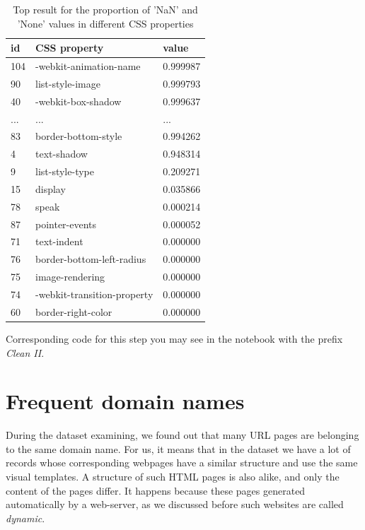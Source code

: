 \begin{table}[h]
\begin{center}
{\renewcommand{\arraystretch}{1.5}
\begin{tabular}{| p{2cm} | p{5cm}| p{3cm} |}
\hline
\textbf{id}    &    \textbf{CSS property}    &    \textbf{value} \\
\hline
104    &    -webkit-animation-name    &    0.999987 \\
\hline
90    &    list-style-image    &    0.999793 \\
\hline
40    &    -webkit-box-shadow    &    0.999637 \\
\hline
...    &    ...    &    ... \\
\hline
83    &    border-bottom-style    &    0.994262 \\
\hline
4    &    text-shadow    &    0.948314 \\
\hline
9    &    list-style-type    &    0.209271 \\
\hline
15    &    display    &    0.035866 \\
\hline
78    &    speak    &    0.000214 \\
\hline
87    &    pointer-events    &    0.000052 \\
\hline
71    &    text-indent    &    0.000000 \\
\hline
76    &    border-bottom-left-radius    &    0.000000 \\
\hline
75    &    image-rendering    &    0.000000 \\
\hline
74    &    -webkit-transition-property    &    0.000000 \\
\hline
60    &    border-right-color    &    0.000000 \\
\hline
\end{tabular}}
\caption{Top result for the proportion of 'NaN' and 'None' values in different CSS properties }
\label{table:cssnan}
\end{center}
\end{table}


Corresponding code for this step you may see in the notebook with the prefix \textit{Clean II}.

\section{Frequent domain names}
During the dataset examining, we found out that many URL pages are belonging to the same domain name. For us, it means that in the dataset we have a lot of records whose corresponding webpages have a similar structure and use the same visual templates. A structure of such HTML pages is also alike, and only the content of the pages differ. It happens because these pages generated automatically by a web-server, as we discussed before such websites are called \textit{dynamic}.\\ 

